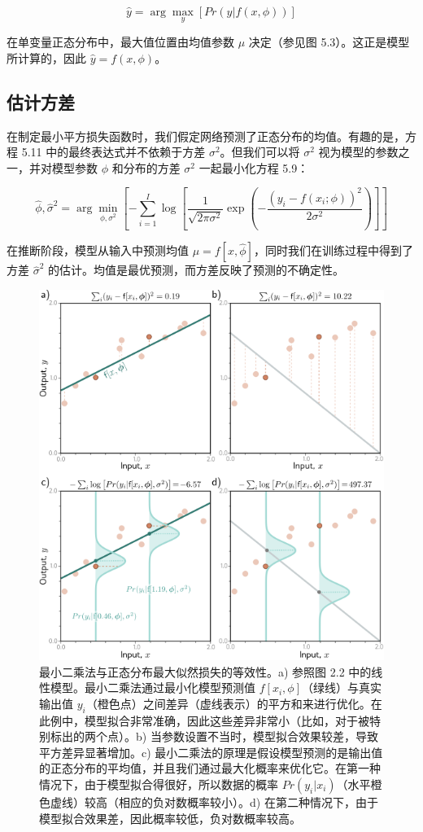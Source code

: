 \begin{equation}
\hat{y} = \arg\max_y [Pr(y|f(x, \phi))] 
\end{equation}


在单变量正态分布中，最大值位置由均值参数 \(\mu\) 决定（参见图 5.3）。这正是模型所计算的，因此 \(\hat{y} = f(x, \phi)\)。
\subsection{估计方差}

在制定最小平方损失函数时，我们假定网络预测了正态分布的均值。有趣的是，方程 5.11 中的最终表达式并不依赖于方差 \(\sigma^2\)。但我们可以将 \(\sigma^2\) 视为模型的参数之一，并对模型参数 \(\phi\) 和分布的方差 \(\sigma^2\) 一起最小化方程 5.9：


\begin{equation}
\hat{\phi}, \hat{\sigma}^2 = \arg\min_{\phi,\sigma^2} \left[ -\sum_{i=1}^I \log \left[ \frac{1}{\sqrt{2\pi\sigma^2}} \exp \left( -\frac{(y_i - f(x_i; \phi))^2}{2\sigma^2} \right) \right] \right] 
\end{equation}


在推断阶段，模型从输入中预测均值 \(\mu = f[x, \hat{\phi}]\)，同时我们在训练过程中得到了方差 \(\hat{\sigma}^2\) 的估计。均值是最优预测，而方差反映了预测的不确定性。

\begin{figure}[ht!]
	\centering
	\includegraphics[width=0.7\linewidth]{png/chapter5/LossNormalRegression.png}
	\caption{最小二乘法与正态分布最大似然损失的等效性。a) 参照图 2.2 中的线性模型。最小二乘法通过最小化模型预测值 \(f[x_i,\phi]\)（绿线）与真实输出值 \(y_i\)（橙色点）之间差异（虚线表示）的平方和来进行优化。在此例中，模型拟合非常准确，因此这些差异非常小（比如，对于被特别标出的两个点）。b) 当参数设置不当时，模型拟合效果较差，导致平方差异显著增加。c) 最小二乘法的原理是假设模型预测的是输出值的正态分布的平均值，并且我们通过最大化概率来优化它。在第一种情况下，由于模型拟合得很好，所以数据的概率 \(Pr(y_i|x_i)\)（水平橙色虚线）较高（相应的负对数概率较小）。d) 在第二种情况下，由于模型拟合效果差，因此概率较低，负对数概率较高。}
\end{figure}


